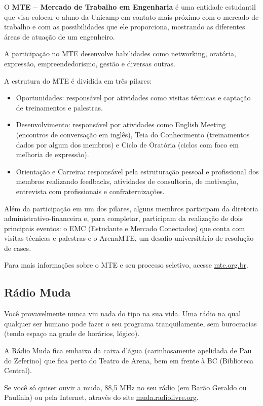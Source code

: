 O \textbf{MTE -- Mercado de Trabalho em Engenharia} é uma entidade estudantil que visa colocar o aluno da Unicamp em
contato mais próximo com o mercado de trabalho e com as possibilidades que ele
proporciona, mostrando as diferentes áreas de atuação de um engenheiro.

A participação no MTE desenvolve habilidades como networking, oratória, expressão, empreendedorismo, gestão e diversas outras.

A estrutura do MTE é dividida em três pilares:

\begin{itemize}
\item Oportunidades: responsável por atividades como visitas técnicas e captação de treinamentos e palestras.
\item Desenvolvimento: responsável por atividades como English Meeting (encontros de conversação em inglês), Teia do Conhecimento (treinamentos dados por algum dos membros) e Ciclo de Oratória (ciclos com foco em melhoria de expressão).
\item Orientação e Carreira: responsável pela estruturação pessoal e profissional dos membros realizando feedbacks, atividades de consultoria, de motivação, entrevista com profissionais e confraternizações.
\end{itemize}

Além da participação em um dos pilares, alguns membros participam da diretoria administrativo-financeira e, para completar, participam da realização de dois principais eventos: o EMC (Estudante e Mercado Conectados) que conta com visitas técnicas e palestras e o ArenaMTE, um desafio universitário de resolução de cases.

Para mais informações sobre o MTE e seu processo seletivo, acesse
\url{mte.org.br}.

\subsection{Rádio Muda}

Você provavelmente nunca viu nada do tipo na sua vida. Uma rádio na qual
qualquer ser humano pode fazer o seu programa tranquilamente, sem burocracias
(tendo espaço na grade de horários, lógico).

A Rádio Muda fica embaixo da caixa d'água (carinhosamente apelidada de Pau do
Zeferino) que fica perto do Teatro de Arena, bem em frente à BC (Biblioteca
Central).

Se você só quiser ouvir a muda, 88,5 MHz no seu rádio (em Barão Geraldo ou
Paulínia) ou pela Internet, através do site \url{muda.radiolivre.org}.

